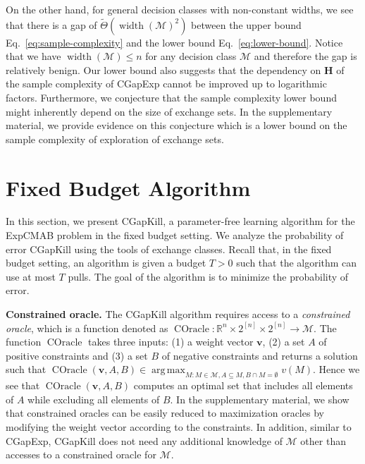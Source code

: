\documentclass{article}
\newcommand{\Algorithm}{{\small \textsf{CGapExp}}\xspace}
\newcommand{\AlgorithmBud}{{\small \textsf{CGapKill}}\xspace}
\newcommand{\Problem}{{\small \textsf{ExpCMAB}}\xspace}
\newcommand{\M}{\mathcal M}
\newcommand{\RR}{\mathbb R}
\DeclareMathOperator{\rank}{width}
\DeclareMathOperator*{\argmax}{arg\,max}
\DeclareMathOperator{\COracle}{COracle}
\newcommand{\Match}{\textsc{Match}\xspace}
\newcommand{\Path}{\textsc{Path}\xspace}
\renewcommand{\vec}[1]{\boldsymbol{#1}}
\begin{document}
On the other hand, for general decision classes with non-constant widths, we see that there is a gap of $\tilde \Theta(\rank(\M)^2)$ between the upper bound Eq.~\eqref{eq:sample-complexity} and the lower bound Eq.~\eqref{eq:lower-bound}.
Notice that we have $\rank(\M) \le n$ for any decision class $\M$ and therefore the gap is relatively benign.
Our lower bound also suggests that the dependency on $\mathbf H$ of the sample complexity of \Algorithm cannot be improved up to logarithmic factors.
Furthermore, we conjecture that the sample complexity lower bound might inherently depend on the size of exchange sets. 
In the supplementary material, we provide evidence on this conjecture which is a lower bound on the sample complexity of exploration of exchange sets.


\section{Fixed Budget Algorithm}
In this section, we present \AlgorithmBud, a parameter-free learning algorithm for the \Problem problem in the fixed budget setting.
We analyze the probability of error \AlgorithmBud using the tools of exchange classes.
Recall that, in the fixed budget setting, an algorithm is given a budget $T>0$ such that the algorithm can use at most $T$ pulls.
The goal of the algorithm is to minimize the probability of error. 

\textbf{Constrained oracle.} 
The \AlgorithmBud algorithm requires access to a \emph{constrained oracle}, which is a function denoted as $\COracle: \RR^{n}\times 2^{[n]} \times 2^{[n]} \rightarrow \M$.
The function $\COracle$ takes three inputs: (1) a weight vector $\vec v$, (2) a set $A$ of positive constraints and (3) a set $B$ of negative constraints and returns a solution such that
$\COracle(\vec v, A, B) \in \argmax_{M: M\in \M, A\subseteq M, B\cap M =\emptyset} v(M).$
Hence we see that $\COracle(\vec v, A, B)$ computes an optimal set that includes all elements of $A$ while excluding all elements of $B$.
In the supplementary material, we show that constrained oracles can be easily reduced to maximization oracles by modifying the weight vector according to the constraints. 
In addition, similar to \Algorithm, \AlgorithmBud does not need any additional knowledge of $\M$ other than accesses to a constrained oracle for $\M$.
\end{document}
